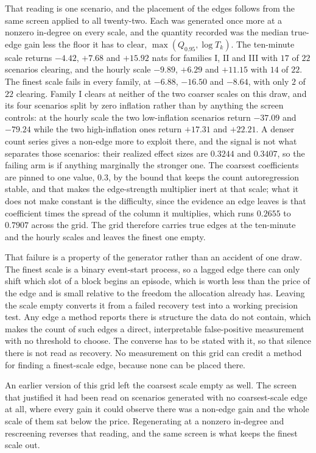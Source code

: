 That reading is one scenario, and the placement of the edges follows from the
same screen applied to all twenty-two. Each was generated once more at a nonzero
in-degree on every scale, and the quantity recorded was the median true-edge
gain less the floor it has to clear, \(\max(Q_{0.95}, \log T_k)\). The
ten-minute scale returns \(-4.42\), \(+7.68\) and \(+15.92\) nats for families I,
II and III with \(17\) of \(22\) scenarios clearing, and the hourly scale
\(-9.89\), \(+6.29\) and \(+11.15\) with \(14\) of \(22\). The finest scale fails
in every family, at \(-6.88\), \(-16.50\) and \(-8.64\), with only \(2\) of
\(22\) clearing. Family I clears at neither of the two coarser scales on this
draw, and its four scenarios split by zero inflation rather than by anything the
screen controls: at the hourly scale the two low-inflation scenarios return
\(-37.09\) and \(-79.24\) while the two high-inflation ones return \(+17.31\) and
\(+22.21\). A denser count series gives a non-edge more to exploit there, and the signal is
not what separates those scenarios: their realized effect sizes are $0.3244$ and
$0.3407$, so the failing arm is if anything marginally the stronger one. The
coarsest coefficients are pinned to one value, $0.3$, by the bound that keeps the
count autoregression stable, and that makes the edge-strength multiplier inert
at that scale; what
it does not make constant is the difficulty, since the evidence an edge leaves is
that coefficient times the spread of the column it multiplies, which runs
$0.2655$ to $0.7907$ across the grid. The grid therefore carries true edges at the
ten-minute and the hourly scales and leaves the finest one empty.

That failure is a property of the generator rather than an accident of one draw.
The finest scale is a binary event-start process, so a lagged edge there can
only shift which slot of a block begins an episode, which is worth less than the
price of the edge and is small relative to the freedom the allocation already
has. Leaving the scale empty converts it from a failed recovery test into a
working precision test. Any edge a method reports there is structure the data do
not contain, which makes the count of such edges a direct, interpretable
false-positive measurement with no threshold to choose. The converse has to be
stated with it, so that silence there is not read as recovery. No measurement on
this grid can credit a method for finding a finest-scale edge, because none can
be placed there.

An earlier version of this grid left the coarsest scale empty as well. The
screen that justified it had been read on scenarios generated with no
coarsest-scale edge at all, where every gain it could observe there was a
non-edge gain and the whole scale of them sat below the price. Regenerating at a
nonzero in-degree and rescreening reverses that reading, and the same screen is
what keeps the finest scale out.

